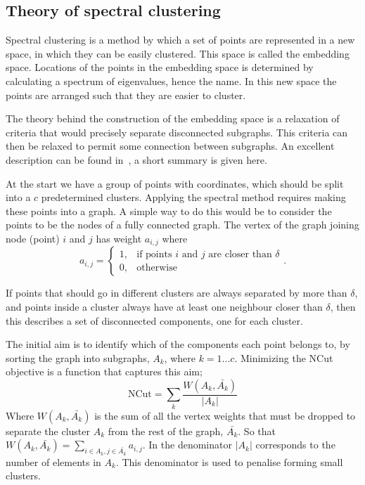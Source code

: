 \subsection{Theory of spectral clustering}\label{sec:spectral_theory}

Spectral clustering is a method by which a set of points are represented in a new space,
in which they can be easily clustered.
This space is called the embedding space.
Locations of the points in the embedding space is determined by calculating a
spectrum of eigenvalues, hence the name.
In this new space the points are arranged such that they are easier to cluster.

The theory behind the construction of the embedding space is a relaxation of criteria that would precisely
separate disconnected subgraphs.
This criteria can then be relaxed to permit some connection between subgraphs.
An excellent description can be found in~\cite{luxburg2007spectraltutorial}, a short summary is given here.

At the start we have a group of points with coordinates, which should be split into a \(c\) predetermined clusters.
Applying the spectral method requires making these points into a graph.
A simple way to do this would be to consider the points to be the nodes of a fully connected graph.
The vertex of the graph joining node (point) \(i\) and \(j\) has weight \(a_{i, j}\) where
\begin{equation}
    a_{i, j}= 
    \begin{cases}
        1, & \text{if points } i \text{ and } j \text{ are closer than } \delta \\
        0,              & \text{otherwise}
    \end{cases}
    .
\end{equation}

If points that should go in different clusters are always separated by more than \(\delta\),
and points inside a cluster always have at least one neighbour closer than \(\delta\),
then this describes a set of disconnected components, one for each cluster.

The initial aim is to identify which of the components each point belongs to,
by sorting the graph into subgraphs, \(A_k\), where \(k=1 \dots c\).
Minimizing the NCut objective is a function that captures this aim; 
\begin{equation}
    \text{NCut} = \sum_k\frac{W(A_k, \bar{A_k})}{|A_k|}
\end{equation}
Where \(W(A_k, \bar{A_k})\) is the sum of all the vertex weights that must be dropped
to separate the cluster \(A_k\) from the rest of the graph, \(\bar{A_k}\).
So that \( W(A_k, \bar{A_k}) = \sum_{i \in A_k, j \in \bar{A_k}} a_{i, j} \).
In the denominator \(|A_k|\) corresponds to the number of elements in \(A_k\).
This denominator is used to penalise forming small clusters.


